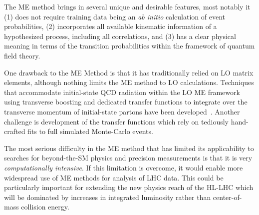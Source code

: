 
The ME method brings in several unique and desirable features, most notably it (1) does not require training data being an \emph{ab initio} calculation of event probabilities, (2) incorporates all available kinematic information of a hypothesized process, including all correlations, and (3) has a clear physical meaning in terms of the transition probabilities within the framework of quantum field theory.

One drawback to the ME Method is that it has traditionally relied on LO matrix elements, although nothing limits the ME method to LO calculations. Techniques that accommodate initial-state QCD radiation within the LO ME framework using transverse boosting and dedicated transfer functions to integrate over the transverse momentum of initial-state partons have been developed~\cite{Alwall:2010cq}.
Another challenge is development of the transfer functions which rely on tediously hand-crafted fits to full simulated Monte-Carlo events.

The most serious difficulty in the ME method that has limited its applicability to searches for beyond-the-SM physics and precision measurements is that it is very \emph{computationally intensive}. If this limitation is overcome, it would enable more widespread use of ME methods for analysis of LHC data. This could be particularly important for extending the new physics reach of the HL-LHC which will be dominated by increases in integrated luminosity rather than center-of-mass collision energy.


